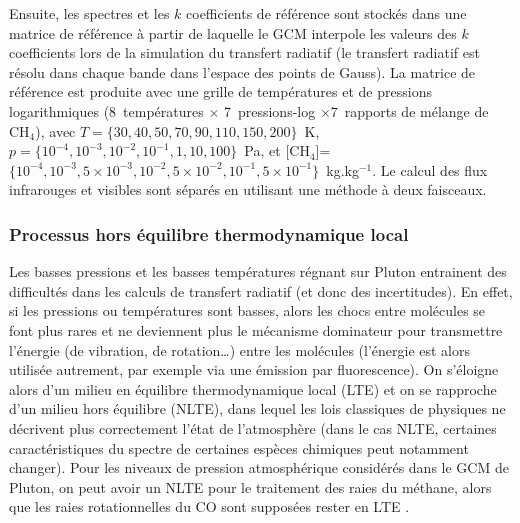 Ensuite, les spectres et les $k$ coefficients de référence sont stockés dans une matrice de référence à partir de laquelle le GCM interpole les valeurs des $k$ coefficients lors de la simulation du transfert radiatif (le transfert radiatif est résolu dans chaque bande dans l'espace des points de Gauss). La matrice de référence est produite avec une grille de températures et de pressions logarithmiques (8~températures $\times$ 7~pressions-log $\times$7~rapports de mélange de CH$_4$), avec $T=\{30, 40, 50, 70, 90, 110, 150, 200\}$~K,  $p=\{10^{-4}, 10^{-3}, 10^{-2}, 10^{-1}, 1, 10, 100\}$~Pa, et [CH$_4$]= $\{10^{-4},  10^{-3}, 5\times10^{-3}, 10^{-2}, 5\times10^{-2}, 10^{-1}, 5\times10^{-1}\}$~kg.kg$^{-1}$.  Le calcul des flux infrarouges et visibles sont séparés en utilisant une méthode à deux faisceaux.

\subsubsection{Processus hors équilibre thermodynamique local}

Les basses pressions et les basses températures régnant sur Pluton entrainent des difficultés dans les calculs de transfert radiatif (et donc des incertitudes). 
En effet, si les pressions ou températures sont basses, alors les chocs entre molécules se font plus rares et ne deviennent plus le mécanisme dominateur pour transmettre l’énergie (de vibration, de rotation…) entre les molécules (l’énergie est alors utilisée autrement, par exemple via une émission par fluorescence). On s’éloigne alors d’un milieu en équilibre thermodynamique local (LTE) et on se rapproche d’un milieu hors équilibre (NLTE), dans lequel les lois classiques de physiques ne décrivent plus correctement l’état de l’atmosphère (dans le cas NLTE, certaines caractéristiques du spectre de certaines espèces chimiques peut notamment changer).
Pour les niveaux de pression atmosphérique considérés dans le GCM de Pluton, on peut avoir un NLTE pour le traitement des raies du méthane, alors que les raies rotationnelles du CO sont supposées rester en LTE \citep{Stro:96}.


